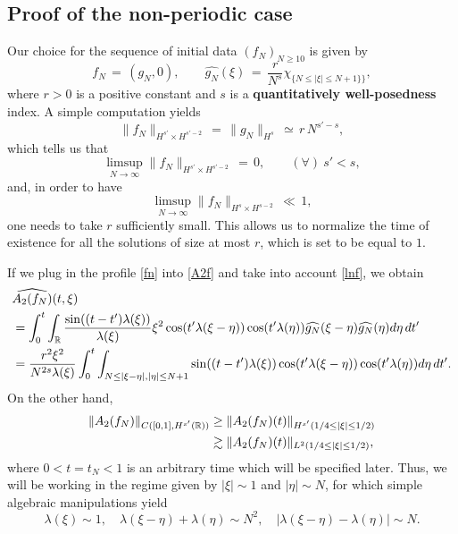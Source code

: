 \documentclass{amsart}
\begin{document}
\subsection{Proof of the non-periodic case} Our choice for the sequence of initial data $(f_N)_{N\geq 10}$ is given by
\begin{equation}
f_N\,=\,(g_N, 0), \qquad \widehat{g_N}(\xi)\,=\,\frac{r}{N^s} \chi_{\{N \leq |\xi| \leq N + 1\}\}},
\label{fn}
\end{equation}
where $r>0$ is a positive constant and $s$ is a \textbf{quantitatively well-posedness} index. A simple computation yields
\begin{equation}
\|f_N\|_{H^{s'}\times H^{s'-2}}\,=\,\|g_N\|_{H^s}\,\simeq\,r\,N^{s'-s},
\label{hsfn}
\end{equation}
which tells us that
\[
\limsup_{N\to \infty} \|f_N\|_{H^{s'} \times H^{s' -2}}\,=\,0, \qquad (\forall)\ s'<s, 
\]
and, in order to have 
\[
\limsup_{N\to \infty} \|f_N\|_{H^s \times H^{s -2}}\,\ll\,1,
\]
one needs to take $r$ sufficiently small. This allows us to normalize the time of existence for all the solutions of size at most $r$, which is set to be equal to $1$.

If we plug in the profile \eqref{fn} into \eqref{A2f} and take into account \eqref{lnf}, we obtain
\begin{equation}
\aligned
&\widehat{A_2(f_N)}(t,\xi)\\
&=\int_0^t \int_{\mathbb{R}} \frac{\sin((t-t') \lambda(\xi))}{\lambda(\xi)} \xi^2 \cos(t' \lambda(\xi-\eta))\cos(t'\lambda(\eta))\widehat{g_N}(\xi-\eta)\widehat{g_N}(\eta)d\eta\,dt'\\
&=\frac{r^2 \xi^2}{N^{2s}\lambda(\xi)}\int_0^t \int_{N \leq |\xi-\eta|, |\eta| \leq N+1}\sin((t-t') \lambda(\xi))\cos(t' \lambda(\xi-\eta))\cos(t'\lambda(\eta))d\eta\,dt'.\endaligned
\label{A2fn}
\end{equation}
On the other hand,
\begin{equation}
\aligned
\|A_2(f_N)\|_{C([0,1], H^{s'}(\mathbb{R}))} &\geq \|A_2(f_N)(t)\|_{H^{s'}(1/4\leq |\xi| \leq 1/2)}\\ &\gtrsim \|A_2(f_N)(t)\|_{L^2(1/4\leq |\xi| \leq 1/2)},\label{hsA2}
\endaligned
\end{equation}
where $0<t=t_N<1$ is an arbitrary time which will be specified later. Thus, we will be working in the regime given by $ |\xi|\sim 1$ and $|\eta|\sim N$, for which simple algebraic manipulations yield
\begin{equation}
\lambda(\xi) \sim 1,\quad \lambda(\xi-\eta)+\lambda(\eta) \sim N^2, \quad \left| \lambda(\xi-\eta)-\lambda(\eta)\right| \sim N.
\label{aprox}
\end{equation}
\end{document}
